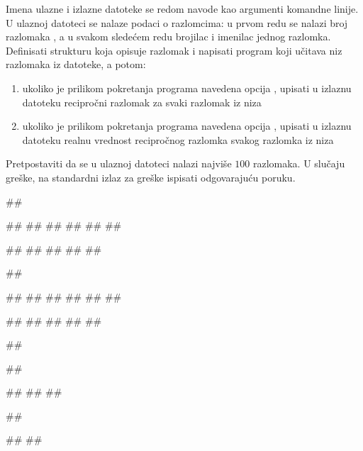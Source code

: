 \begin{Exercise}[label=v3_05] 
Imena ulazne i izlazne datoteke se redom navode kao argumenti komandne linije.  
U ulaznoj datoteci se nalaze podaci o razlomcima:
u prvom redu se nalazi broj razlomaka , a u svakom sledećem redu brojilac i imenilac jednog razlomka. 
Definisati strukturu koja opisuje razlomak i napisati program koji učitava niz
razlomaka iz datoteke, a potom:
\begin{enumerate}
\item ukoliko je prilikom pokretanja programa navedena opcija , upisati u izlaznu datoteku recipročni 
razlomak za svaki razlomak iz niza
\item ukoliko je prilikom pokretanja programa navedena opcija , upisati u izlaznu datoteku 
realnu vrednost recipročnog razlomka svakog razlomka iz niza
\end{enumerate}
Pretpostaviti da se u ulaznoj datoteci nalazi najviše $100$ razlomaka.
U slučaju greške, na standardni izlaz za greške ispisati odgovarajuću poruku.

\begin{miditest}
\begin{upotreba}{1}
##

##
##
##
##
##
##

##
##
##
##
##
\end{upotreba}
\end{miditest}
\begin{miditest}
\begin{upotreba}{2}
##

##
##
##
##
##
##

##
##
##
##
##
\end{upotreba}
\end{miditest}

\begin{miditest}
\begin{upotreba}{3}
##

##

#\naslovIzlazZaGresku#
##
##
\end{upotreba}
\end{miditest}
\begin{miditest}
\begin{upotreba}{4}
##

#\naslovIzlazZaGresku#
##
\end{upotreba}
\end{miditest}
\end{Exercise}
\begin{Answer}[ref=v3_05]
\end{Answer}


